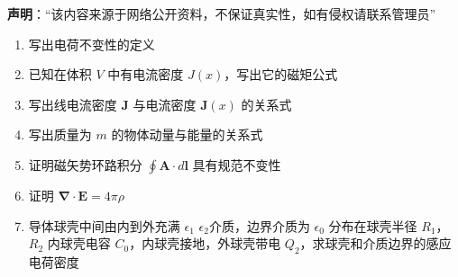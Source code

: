 

\textbf{声明}：“该内容来源于网络公开资料，不保证真实性，如有侵权请联系管理员”



\begin{enumerate}
    \item 写出电荷不变性的定义
    \item 已知在体积 $V$ 中有电流密度 $J(x)$，写出它的磁矩公式
    \item 写出线电流密度 $\mathbf{J}$ 与电流密度 $\mathbf{J}(x)$ 的关系式
    \item 写出质量为 $m$ 的物体动量与能量的关系式
    \item 证明磁矢势环路积分 $\oint \mathbf{A} \cdot d\mathbf{l}$ 具有规范不变性
    \item 证明 $\mathbf{\nabla} \cdot \mathbf{E} = 4 \pi \rho$
    \item 导体球壳中间由内到外充满  $\epsilon_1$  $\epsilon_2$介质，边界介质为 $\epsilon_0$ 分布在球壳半径 $R_1$，$R_2$ 内球壳电容 $C_0$，内球壳接地，外球壳带电 $Q_2$，求球壳和介质边界的感应电荷密度
\end{enumerate}


